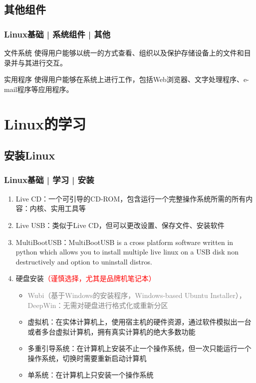 \subsection{其他组件}
\begin{frame}
  \frametitle{Linux基础 | 系统组件 | 其他}
  \begin{block}{文件系统}
    使得用户能够以统一的方式查看、组织以及保护存储设备上的文件和目录并与其进行交互。
  \end{block}
  \pause
  \begin{block}{实用程序}
    使得用户能够在系统上进行工作，包括Web浏览器、文字处理程序、e-mail程序等应用程序。
  \end{block}
\end{frame}

\section{Linux的学习}
\subsection{安装Linux}
\begin{frame}
  \frametitle{Linux基础 | 学习 | 安装}
  \begin{enumerate}[<+->]
    \item Live CD：一个可引导的CD-ROM，包含运行一个完整操作系统所需的所有内容：内核、实用工具等
    \item Live USB：类似于Live CD，但可以更改设置、保存文件、安装软件
    \item \alert{MultiBootUSB}：MultiBootUSB is a cross platform software written in python which allows you to install multiple live linux on a USB disk non destructively and option to uninstall distros.
    \item 硬盘安装\textcolor{red}{（谨慎选择，尤其是品牌机笔记本）}
      \begin{itemize}
        \item \textcolor{gray}{Wubi（基于Windows的安装程序，Windows-based Ubuntu Installer），DeepWin：无需对硬盘进行格式化或重新分区}
        \item 虚拟机：在实体计算机上，使用宿主机的硬件资源，通过软件模拟出一台或者多台虚拟计算机，拥有真实计算机的绝大多数功能
        \item 多重引导系统：在计算机上安装不止一个操作系统，但一次只能运行一个操作系统，切换时需要重新启动计算机
        \item 单系统：在计算机上只安装一个操作系统
      \end{itemize}
  \end{enumerate}
\end{frame}

